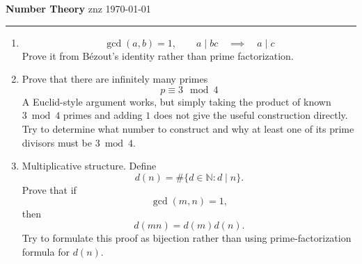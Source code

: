 \documentclass[12pt]{article}
\begin{document}
\noindent
{\large\bfseries Number Theory}
\hfill
znz
\quad
\today

\hrule
\medskip

\begin{enumerate}
\item \[
        \gcd(a, b)=1, \qquad a \mid bc
        \quad \implies \quad
        a \mid c
        \]
        Prove it from Bézout's identity rather than prime factorization.
\item Prove that there are infinitely many primes
        \[
        p \equiv 3 \mod{4}
        \]
        A Euclid-style argument works, but simply taking the product of known \(3\bmod4\) primes and adding \(1\) does not give the useful construction directly. Try to determine what number to construct and why at least one of its prime divisors must be \(3\bmod4\).
\item Multiplicative structure. Define
        \[
        d(n)=\# \{d \in \mathbb{N} : d \mid n\}.
        \]
        Prove that if
        \[
        \gcd(m, n)=1,
        \]
        then
        \[
        d(mn)=d(m)d(n).
        \]
        Try to formulate this proof as bijection rather than using prime-factorization formula for $d(n)$.
\end{enumerate}
\end{document}
